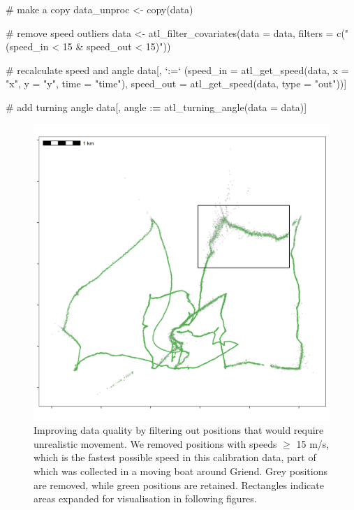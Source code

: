 \documentclass[]{scrreprt}
\newenvironment{Shaded}{}{}
\newcommand{\CommentTok}[1]{\textcolor[rgb]{0.00,0.50,0.00}{#1}}
\newcommand{\DataTypeTok}[1]{#1}
\newcommand{\ErrorTok}[1]{\textcolor[rgb]{1.00,0.00,0.00}{\textbf{#1}}}
\newcommand{\KeywordTok}[1]{\textcolor[rgb]{0.00,0.00,1.00}{#1}}
\newcommand{\NormalTok}[1]{#1}
\newcommand{\OperatorTok}[1]{#1}
\newcommand{\StringTok}[1]{\textcolor[rgb]{0.00,0.50,0.50}{#1}}
\begin{document}
\begin{Shaded}
\begin{Highlighting}[]
\CommentTok{# make a copy}
\NormalTok{data_unproc <-}\StringTok{ }\KeywordTok{copy}\NormalTok{(data)}

\CommentTok{# remove speed outliers}
\NormalTok{data <-}\StringTok{ }\KeywordTok{atl_filter_covariates}\NormalTok{(}\DataTypeTok{data =}\NormalTok{ data,}
            \DataTypeTok{filters =} \KeywordTok{c}\NormalTok{(}\StringTok{"(speed_in < 15 & speed_out < 15)"}\NormalTok{))}

\CommentTok{# recalculate speed and angle}
\NormalTok{data[, }\StringTok{`}\DataTypeTok{:=}\StringTok{`}\NormalTok{ (}\DataTypeTok{speed_in =} \KeywordTok{atl_get_speed}\NormalTok{(data, }
                                      \DataTypeTok{x =} \StringTok{"x"}\NormalTok{, }
                                      \DataTypeTok{y =} \StringTok{"y"}\NormalTok{, }
                                      \DataTypeTok{time =} \StringTok{"time"}\NormalTok{),}
             \DataTypeTok{speed_out =} \KeywordTok{atl_get_speed}\NormalTok{(data, }\DataTypeTok{type =} \StringTok{"out"}\NormalTok{))]}

\CommentTok{# add turning angle}
\NormalTok{data[, angle }\OperatorTok{:}\ErrorTok{=}\StringTok{ }\KeywordTok{atl_turning_angle}\NormalTok{(}\DataTypeTok{data =}\NormalTok{ data)]}
\end{Highlighting}
\end{Shaded}

\begin{figure}
\centering
\includegraphics{figures/fig_speed_outlier.png}
\caption{Improving data quality by filtering out positions that would require unrealistic movement. We removed positions with speeds \(\geq\) 15 m/s, which is the fastest possible speed in this calibration data, part of which was collected in a moving boat around Griend. Grey positions are removed, while green positions are retained. Rectangles indicate areas expanded for visualisation in following figures.}
\end{figure}
\end{document}

